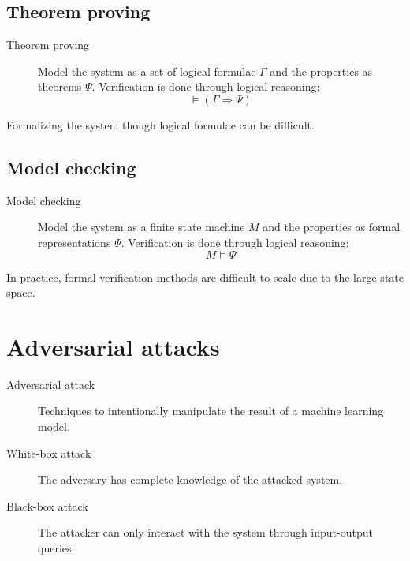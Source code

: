 \subsection{Theorem proving}

\begin{description}
    \item[Theorem proving] 
        Model the system as a set of logical formulae $\Gamma$ and the properties as theorems $\Psi$. Verification is done through logical reasoning:
        \[ \models (\Gamma \Rightarrow \Psi) \]
\end{description}

\begin{remark}
    Formalizing the system though logical formulae can be difficult.
\end{remark}


\subsection{Model checking}

\begin{description}
    \item[Model checking] 
        Model the system as a finite state machine $M$ and the properties as formal representations $\Psi$. Verification is done through logical reasoning:
        \[ M \models \Psi \]
\end{description}

\begin{remark}
    In practice, formal verification methods are difficult to scale due to the large state space.
\end{remark}



\section{Adversarial attacks}

\begin{description}
    \item[Adversarial attack] 
        Techniques to intentionally manipulate the result of a machine learning model.

    \item[White-box attack] 
        The adversary has complete knowledge of the attacked system.

    \item[Black-box attack] 
        The attacker can only interact with the system through input-output queries.
\end{description}


